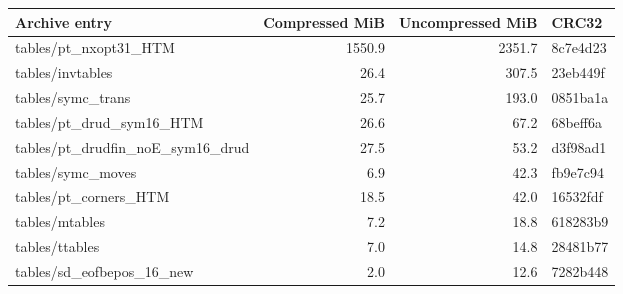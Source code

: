 {\small
\begin{tabular}{lrrl}
\hline
Archive entry & Compressed MiB & Uncompressed MiB & CRC32 \\
\hline
tables/pt\_nxopt31\_HTM & 1550.9 & 2351.7 & 8c7e4d23 \\
tables/invtables & 26.4 & 307.5 & 23eb449f \\
tables/symc\_trans & 25.7 & 193.0 & 0851ba1a \\
tables/pt\_drud\_sym16\_HTM & 26.6 & 67.2 & 68beff6a \\
tables/pt\_drudfin\_noE\_sym16\_drud & 27.5 & 53.2 & d3f98ad1 \\
tables/symc\_moves & 6.9 & 42.3 & fb9e7c94 \\
tables/pt\_corners\_HTM & 18.5 & 42.0 & 16532fdf \\
tables/mtables & 7.2 & 18.8 & 618283b9 \\
tables/ttables & 7.0 & 14.8 & 28481b77 \\
tables/sd\_eofbepos\_16\_new & 2.0 & 12.6 & 7282b448 \\
\hline
\end{tabular}
}
